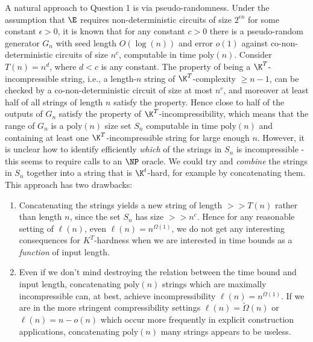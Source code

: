 \documentclass[11pt]{article}
\renewcommand{\poly}{\mathrm{poly}}
\begin{document}
A natural approach to Question 1 is via pseudo-randomness. Under the assumption that $\E$ requires non-deterministic circuits of size $2^{\epsilon n}$ for some constant $\epsilon > 0$, it is known \cite{IW97, KvM99} that for any constant $c > 0$ there is a pseudo-random generator $G_n$ with seed length $O(\log(n))$ and error $o(1)$ against co-non-deterministic circuits of size $n^c$, computable in time $\poly(n)$. Consider $T(n) = n^d$, where $d < c$ is any constant. The property of being a $\K^T$-incompressible string, i.e., a length-$n$ string of $\K^T$-complexity $\geq n-1$, can be checked by a co-non-deterministic circuit of size at most $n^c$, and moreover at least half of all strings of length $n$ satisfy the property. Hence close to half of the outputs of $G_n$ satisfy the property of $\K^T$-incompressibility, which means that the range of $G_n$ is a $\poly(n)$ size set $S_n$ computable in time $\poly(n)$ and containing at least one $\K^T$-incompressible string for large enough $n$. However, it is unclear how to identify efficiently {\it which} of the strings in $S_n$ is incompressible - this seems to require calls to an $\NP$ oracle. We could try and {\it combine} the strings in $S_n$ together into a string that is $\K^t$-hard, for example by concatenating them. This approach has two drawbacks:
\begin{enumerate}
    \item  Concatenating the strings yields a new string of length $>> T(n)$ rather than length $n$, since the set $S_n$ has size $>> n^c$. Hence for any reasonable setting of $\ell(n)$, even $\ell(n) = n^{\Omega(1)}$, we do not get any interesting consequences for $K^T$-hardness when we are interested in time bounds as a {\it function} of input length.
    \item Even if we don't mind destroying the relation between the time bound and input length, concatenating $\poly(n)$ strings which are maximally incompressible can, at best, achieve incompressibility $\ell(n) = n^{\Omega(1)}$. If we are in the more stringent compressibility settings $\ell(n) = \tilde{\Omega}(n)$ or $\ell(n) = n - o(n)$ which occur more frequently in explicit construction applications, concatenating $\poly(n)$ many strings appears to be useless.
\end{enumerate}
\end{document}
